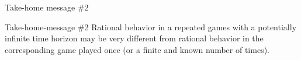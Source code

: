 \begin{frame}{Take-home message \#2}
    \begin{block}{Take-home-message \#2}
        Rational behavior in a repeated games with a potentially infinite time horizon may be
        very different from rational behavior in the corresponding game played once (or a finite
        and known number of times).
    \end{block}
\end{frame}
